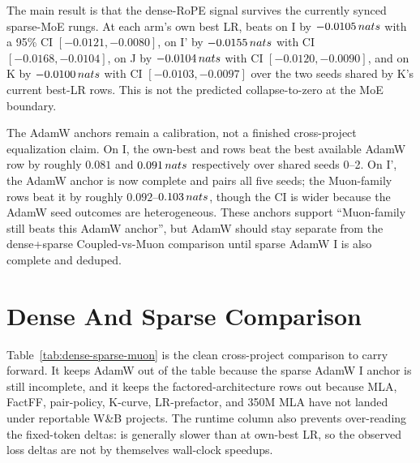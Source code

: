 \documentclass[11pt,a4paper]{article}
\begin{document}
\begin{table}[h]
\centering
{}
\caption{Best LR per sparse-MoE rung and optimizer after dedupe. L has only a single Muon best-LR seed and is not used for a Coupled-vs-Muon claim.}\label{tab:part2-best-lr}
\end{table}

The main result is that the dense-RoPE signal survives the currently synced sparse-MoE rungs. At each arm's own best LR, \optCoupled{} beats \optMuon{} on I by $-0.0105\,nats{}$ with a 95\% CI $[-0.0121,-0.0080]$, on I' by $-0.0155\,nats{}$ with CI $[-0.0168,-0.0104]$, on J by $-0.0104\,nats{}$ with CI $[-0.0120,-0.0090]$, and on K by $-0.0100\,nats{}$ with CI $[-0.0103,-0.0097]$ over the two seeds shared by K's current best-LR rows. This is not the predicted collapse-to-zero at the MoE boundary.

The AdamW anchors remain a calibration, not a finished cross-project equalization claim. On I, the own-best \optMuon{} and \optCoupled{} rows beat the best available AdamW row by roughly $0.081$ and $0.091\,nats{}$ respectively over shared seeds 0--2. On I', the AdamW anchor is now complete and pairs all five seeds; the Muon-family rows beat it by roughly $0.092$--$0.103\,nats{}$, though the CI is wider because the AdamW seed outcomes are heterogeneous. These anchors support ``Muon-family still beats this AdamW anchor'', but AdamW should stay separate from the dense+sparse Coupled-vs-Muon comparison until sparse AdamW I is also complete and deduped.

\section{Dense And Sparse Comparison}

\begin{table}[h]
\centering
\scriptsize
{}
\caption{Unified Coupled-vs-Muon readout across dense and currently synced sparse rungs. Deltas are paired median final-validation-loss differences at each arm's own best LR; negative values favour \optCoupled{}. Runtime is the median \optCoupled{}/\optMuon{} ratio at those own-best LR rows, and is diagnostic rather than a speedup claim.}\label{tab:dense-sparse-muon}
\end{table}

Table~\ref{tab:dense-sparse-muon} is the clean cross-project comparison to carry forward. It keeps AdamW out of the table because the sparse AdamW I anchor is still incomplete, and it keeps the factored-architecture rows out because MLA, FactFF, pair-policy, K-curve, LR-prefactor, and 350M MLA have not landed under reportable W\&B projects. The runtime column also prevents over-reading the fixed-token deltas: \optCoupled{} is generally slower than \optMuon{} at own-best LR, so the observed loss deltas are not by themselves wall-clock speedups.
\end{document}

